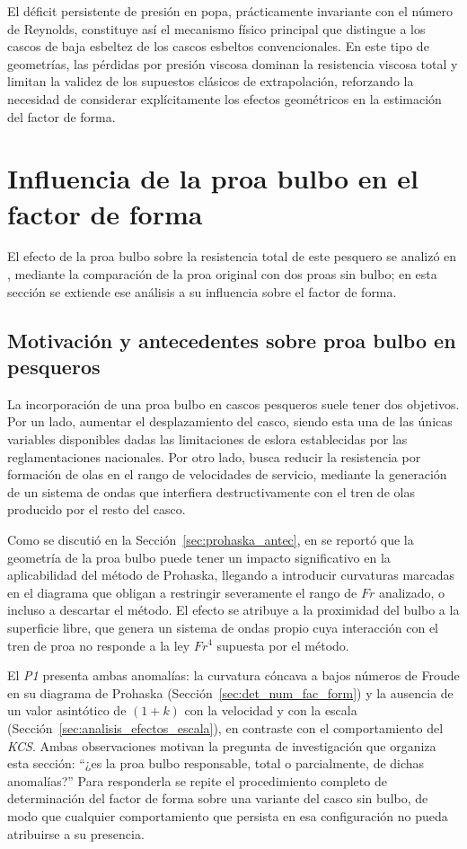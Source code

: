 El déficit persistente de presión en popa, prácticamente invariante con el 
número de Reynolds, constituye así el mecanismo físico principal que 
distingue a los cascos de baja esbeltez de los cascos esbeltos convencionales. 
En este tipo de geometrías, las pérdidas por presión viscosa dominan la 
resistencia viscosa total y limitan la validez de los supuestos clásicos de 
extrapolación, reforzando la necesidad de considerar explícitamente los 
efectos geométricos en la estimación del factor de forma.

\section{Influencia de la proa bulbo en el factor de forma}\label{sec:proa_bulbo}

El efecto de la proa bulbo sobre la resistencia total de este pesquero se
analizó en \citet{diazojeda2024bulbous}, mediante la comparación de la proa
original con dos proas sin bulbo; en esta sección se extiende ese análisis a su
influencia sobre el factor de forma.

\subsection{Motivación y antecedentes sobre proa bulbo en pesqueros}

La incorporación de una proa bulbo en cascos pesqueros suele tener dos 
objetivos. Por un lado, aumentar el desplazamiento del casco, siendo esta 
una de las únicas variables disponibles dadas las limitaciones de eslora 
establecidas por las reglamentaciones nacionales. Por otro lado, busca 
reducir la resistencia por formación de olas en el rango de velocidades de 
servicio, mediante la generación de un sistema de ondas que interfiera 
destructivamente con el tren de olas producido por el resto del casco.

Como se discutió en la Sección~\ref{sec:prohaska_antec}, 
en \citet{korkmaz_cfd_2021} se reportó que la geometría de la proa bulbo puede 
tener un impacto significativo en la aplicabilidad del método de Prohaska, 
llegando a introducir curvaturas marcadas en el diagrama que obligan a 
restringir severamente el rango de $Fr$ analizado, o incluso a descartar el 
método. El efecto se atribuye a la proximidad del bulbo a la superficie 
libre, que genera un sistema de ondas propio cuya interacción con el tren de 
proa no responde a la ley $Fr^4$ supuesta por el método.

El \textit{P1} presenta ambas anomalías: la curvatura cóncava a bajos 
números de Froude en su diagrama de Prohaska 
(Sección~\ref{sec:det_num_fac_form}) y la ausencia de un valor asintótico de 
$(1+k)$ con la velocidad y con la escala 
(Sección~\ref{sec:analisis_efectos_escala}), en contraste con el 
comportamiento del \textit{KCS}. Ambas observaciones motivan la pregunta de 
investigación que organiza esta sección: ``¿es la proa bulbo 
responsable, total o parcialmente, de dichas anomalías?'' Para responderla se 
repite el procedimiento completo de determinación del factor de forma sobre 
una variante del casco sin bulbo, de modo que cualquier comportamiento que 
persista en esa configuración no pueda atribuirse a su presencia.

